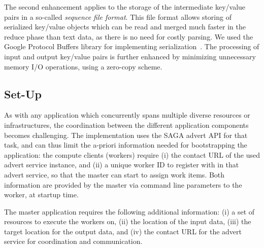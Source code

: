 \documentclass[3p,twocolumn]{elsarticle}
\begin{document}
The second enhancement applies to the storage of
the intermediate key/value pairs in a so-called \emph{sequence file
  format}. This file format allows storing of serialized key/value
objects which can be read and merged much faster in the reduce phase
than text data, as there is no need for costly parsing.  We used the
Google Protocol Buffers library for implementing
serialization~\cite{protobuf}. The processing of input and output
key/value pairs is further enhanced by minimizing unnecessary memory
I/O operations, using a zero-copy scheme.



\subsection{\sagamapreduce Set-Up}

As with any application which concurrently spans multiple diverse
resources or infrastructures, the coordination between the different
application components becomes challenging.  The \smr implementation
uses the SAGA advert API for that task, and can thus limit the a-priori
information needed for bootstrapping the application: the compute
clients (workers) require (i) the contact URL of the used advert
service instance, and (ii) a unique worker ID to register with in that
advert service, so that the master can start to assign work items.
Both information are provided by the master via command line
parameters to the worker, at startup time.

The master application requires the following additional information:
(i) a set of resources to execute the workers on, (ii) the
location of the input data, (iii) the target location for the output
data, and (iv) the contact URL for the advert service for
coordination and communication.
\end{document}
